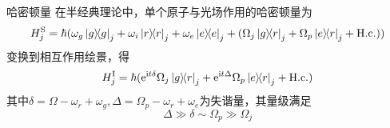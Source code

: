 \documentclass[10pt,aspectratio=43]{beamer}
\begin{document}
\begin{frame}{哈密顿量}
在半经典理论中，单个原子与光场作用的哈密顿量为
\begin{equation}
H_j^\mathrm{S}=\hbar(\omega_g\ketbra{g}{g}_j+\omega_i\ketbra{r}{r}_j+\omega_e\ketbra{e}{e}_j+(\Omega_j\ketbra{g}{r}_j+\Omega_p\ketbra{e}{r}_j+\mathrm{H.c.}))
\end{equation}
变换到相互作用绘景，得
\begin{equation}\label{}
H_j^\mathrm{I}=\hbar(\mathrm{e}^{\mathrm{i}t\delta}\Omega_j\ketbra{g}{r}_j+\mathrm{e}^{\mathrm{i}t\Delta}\Omega_p\ketbra{e}{r}_j+\mathrm{H.c.})
\end{equation}
其中$ \delta=\Omega-\omega_r+\omega_g,\Delta=\Omega_p-\omega_r+\omega_e
 $为失谐量，其量级满足
\begin{equation}
\Delta\gg\delta\sim\Omega_p\gg\Omega_j
\end{equation}
\end{frame}
\end{document}
